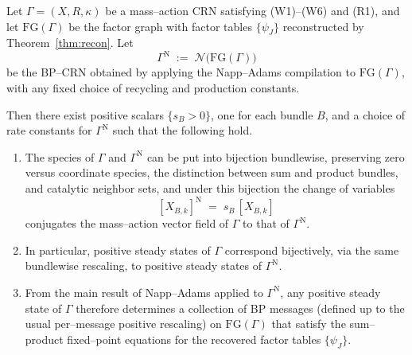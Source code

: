 \documentclass[10pt,a4paper]{amsart}
\begin{document}
\begin{corollary}\label{cor:roundtrip}
Let $\Gamma=(X,R,\kappa)$ be a mass--action CRN satisfying
\textup{(W1)--(W6)} and \textup{(R1)}, and let $\mathrm{FG}(\Gamma)$ be the
factor graph with factor tables $\{\psi_J\}$ reconstructed by
Theorem~\textup{\ref{thm:recon}}. Let
\[
  \Gamma^{\mathrm N} \;:=\; \mathcal N\bigl(\mathrm{FG}(\Gamma)\bigr)
\]
be the BP--CRN obtained by applying the Napp--Adams compilation to
$\mathrm{FG}(\Gamma)$, with any fixed choice of recycling and production
constants.

Then there exist positive scalars $\{s_B>0\}$, one for each bundle $B$, and
a choice of rate constants for $\Gamma^{\mathrm N}$ such that the following
hold.
\begin{enumerate}
  \item The species of $\Gamma$ and $\Gamma^{\mathrm N}$ can be put into
        bijection bundlewise, preserving zero versus coordinate species,
        the distinction between sum and product bundles, and catalytic
        neighbor sets, and under this bijection the change of variables
        \[
          [X_{B,k}]^{\mathrm N} \;=\; s_B\,[X_{B,k}]
        \]
        conjugates the mass--action vector field of $\Gamma$ to that of
        $\Gamma^{\mathrm N}$.

  \item In particular, positive steady states of $\Gamma$ correspond
        bijectively, via the same bundlewise rescaling, to positive steady
        states of $\Gamma^{\mathrm N}$.

  \item From the main result of Napp--Adams applied to
        $\Gamma^{\mathrm N}$, any positive steady state of $\Gamma$
        therefore determines a collection of BP messages (defined up to the
        usual per--message positive rescaling) on $\mathrm{FG}(\Gamma)$
        that satisfy the sum--product fixed--point equations for the
        recovered factor tables $\{\psi_J\}$.
\end{enumerate}
\end{corollary}
\end{document}
